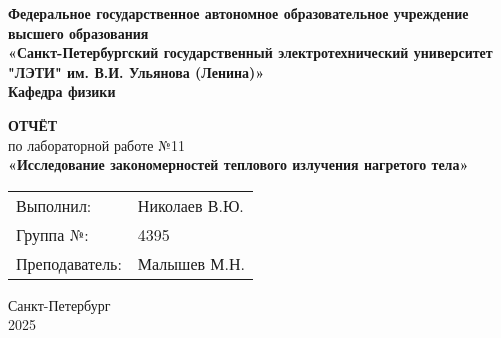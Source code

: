 \begin{center}
	\textbf{Федеральное государственное автономное образовательное учреждение высшего образования} \\
	\textbf{«Санкт-Петербургский государственный электротехнический университет "ЛЭТИ" им. В.И. Ульянова (Ленина)»} \\
	\vspace{0.5cm}
	\textbf{Кафедра физики}
\end{center}

\begin{center}
	\vspace{4cm}
	\textbf{\LARGE ОТЧЁТ}\\
	по лабораторной работе №11 \\
	\vspace{0.5cm}
	\textbf{«Исследование закономерностей теплового излучения нагретого тела»}
	\vspace{2cm}
\end{center}

\begin{tabular}{@{} l l @{}}
	Выполнил:      & Николаев В.Ю. \\[0.5em]
	Группа  №:     & 4395          \\[2em]
	Преподаватель: & Малышев М.Н.
\end{tabular}

\begin{center}
	\vfill
	Санкт-Петербург \\
	2025
\end{center}
